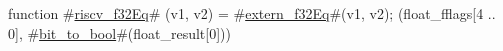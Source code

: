 function #\hyperref[sailRISCVzriscvzyf32Eq]{riscv\_f32Eq}# (v1, v2) = {
  #\hyperref[sailRISCVzexternzyf32Eq]{extern\_f32Eq}#(v1, v2);
  (float_fflags[4 .. 0], #\hyperref[sailRISCVzbitzytozybool]{bit\_to\_bool}#(float_result[0]))
}
